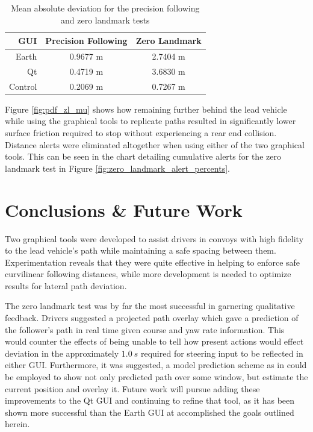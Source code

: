 \documentclass[twocolumn,10pt]{article}
\begin{document}
    \begin{table}[htbp] \centering
      \caption{Mean absolute deviation for the precision following and zero landmark tests}
      \begin{tabular}{r|c|c|} 
        GUI&         Precision Following & Zero Landmark \\
        \hline
        Earth&      0.9677 m & 2.7404 m \\
        Qt&         0.4719 m & 3.6830 m \\
        Control&    0.2069 m & 0.7267 m \\ \hline 
      \end{tabular}
      \label{tab:dev_mean}
    \end{table}
    
    Figure \ref{fig:pdf_zl_mu} shows how remaining further behind the lead vehicle while using the graphical tools to replicate paths resulted in significantly lower surface friction required to stop without experiencing a rear end collision. Distance alerts were eliminated altogether when using either of the two graphical tools. This can be seen in the chart detailing cumulative alerts for the zero landmark test in Figure \ref{fig:zero_landmark_alert_percents}.




\section*{Conclusions \& Future Work}

  Two graphical tools were developed to assist drivers in convoys with high fidelity to the lead vehicle's path while maintaining a safe spacing between them.  Experimentation reveals that they were quite effective in helping to enforce safe curvilinear following distances, while more development is needed to optimize results for lateral path deviation.  

  The zero landmark test was by far the most successful in garnering qualitative feedback.  Drivers suggested a projected path overlay which gave a prediction of the follower's path in real time given course and yaw rate information.  This would counter the effects of being unable to tell how present actions would effect deviation in the approximately $1.0~s$ required for steering input to be reflected in either GUI.  Furthermore, it was suggested, a model prediction scheme as in \cite{williamthesis} could be employed to show not only predicted path over some window, but estimate the current position and overlay it.  Future work will pursue adding these improvements to the Qt GUI and continuing to refine that tool, as it has been shown more successful than the Earth GUI at accomplished the goals outlined herein.
\end{document}
